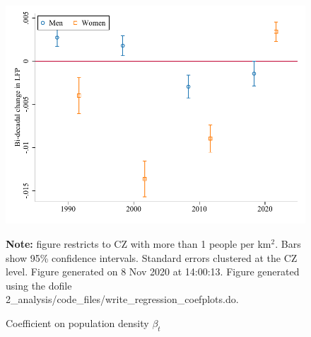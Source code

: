 \begin{figure}[!h]
\centering
\caption{Coefficient on population density $ \beta_t $}
\includegraphics[width=1\textwidth]{../2_analysis/output/figures/d_lfp_gender_full_time}
\par \begin{minipage}[h]{\textwidth}{\tiny\textbf{Note:} figure restricts to CZ with more than 1 people per km$^2$. Bars show 95\% confidence intervals. Standard errors clustered at the CZ level. Figure generated on  8 Nov 2020 at 14:00:13. Figure generated using the dofile 2\_analysis/code\_files/write\_regression\_coefplots.do.}\end{minipage}
\end{figure}
